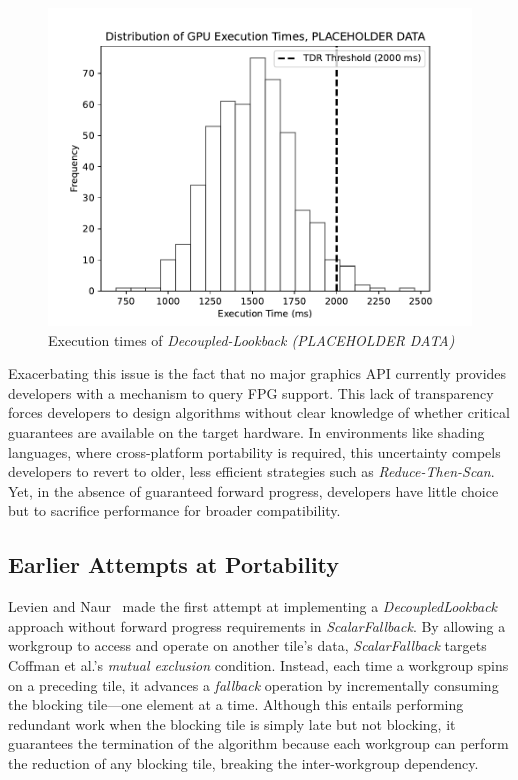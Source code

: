 \documentclass[sigconf]{acmart}
\begin{document}
\begin{figure}[h]
  \centering
  \includegraphics[width=\linewidth]{graphics/Figure_1.pdf}
  \caption{Execution times of \emph{Decoupled-Lookback (PLACEHOLDER DATA)}}
\end{figure}

Exacerbating this issue is the fact that no major graphics API currently provides developers with a mechanism to query FPG support. This lack of transparency forces developers to design algorithms without clear knowledge of whether critical guarantees are available on the target hardware. In environments like shading languages, where cross-platform portability is required, this uncertainty compels developers to revert to older, less efficient strategies such as \emph{Reduce-Then-Scan}. Yet, in the absence of guaranteed forward progress, developers have little choice but to sacrifice performance for broader compatibility.

\subsection{Earlier Attempts at Portability}
Levien and Naur~\cite{Raph2021} made the first attempt at implementing a \emph{DecoupledLookback} approach without forward progress requirements in \emph{ScalarFallback}. By allowing a workgroup to access and operate on another tile’s data, \emph{ScalarFallback} targets Coffman et al.'s \emph{mutual exclusion} condition. Instead, each time a workgroup spins on a preceding tile, it advances a \emph{fallback} operation by incrementally consuming the blocking tile---one element at a time. Although this entails performing redundant work when the blocking tile is simply late but not blocking, it guarantees the termination of the algorithm because each workgroup can perform the reduction of any blocking tile, breaking the inter-workgroup dependency.
\end{document}
